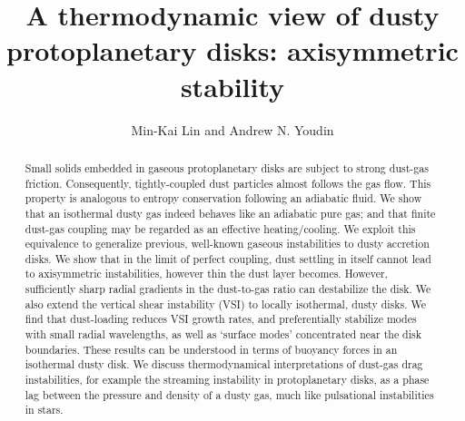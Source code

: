 \documentclass[iop, numberedappendix]{emulateapj}
\begin{document}
\title{A thermodynamic view of dusty protoplanetary disks:
  axisymmetric stability}  
\author{Min-Kai Lin and Andrew N. Youdin}

\begin{abstract}
  Small solids embedded in gaseous protoplanetary disks are subject
  to strong dust-gas friction. Consequently, tightly-coupled dust
  particles almost follows the gas flow. 
  This property is analogous to 
  entropy  conservation
  following an adiabatic fluid.  We show that an isothermal dusty gas indeed behaves like an  
  adiabatic pure gas; and that finite dust-gas coupling may be
  regarded as an effective 
  heating/cooling. We exploit this equivalence 
  to generalize previous, well-known gaseous instabilities
  to dusty accretion disks.
We show that in the limit of perfect coupling, dust settling in
itself cannot lead to axisymmetric instabilities, however thin the dust layer becomes.     
However, sufficiently sharp radial gradients in the dust-to-gas ratio
can destabilize the disk.  
We also extend 
the vertical shear instability (VSI) to locally isothermal, dusty 
disks. We find that  dust-loading reduces VSI growth rates, and
preferentially stabilize modes with small radial 
wavelengths, as well as `surface modes' concentrated near the
disk boundaries. 
These results can be understood in terms of 
buoyancy forces in an isothermal dusty disk. 
We discuss thermodynamical interpretations of 
dust-gas drag instabilities, for example the streaming
instability in protoplanetary disks, as a phase lag between the pressure 
and density of a dusty gas, much like pulsational instabilities 
in stars.  
\end{abstract}
\end{document}
